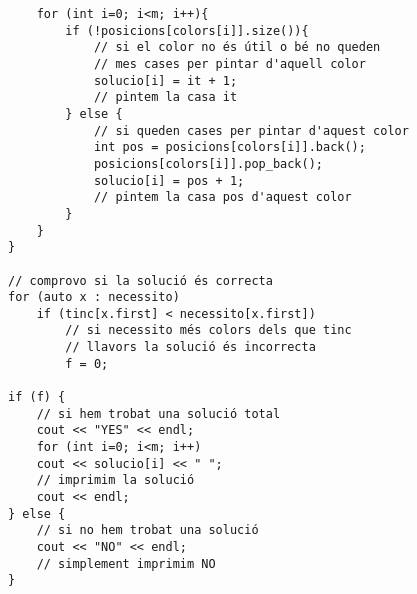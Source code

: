 \begin{lstlisting}
    for (int i=0; i<m; i++){
        if (!posicions[colors[i]].size()){
            // si el color no és útil o bé no queden
            // mes cases per pintar d'aquell color
            solucio[i] = it + 1;
            // pintem la casa it
        } else {
            // si queden cases per pintar d'aquest color
            int pos = posicions[colors[i]].back();
            posicions[colors[i]].pop_back();
            solucio[i] = pos + 1;
            // pintem la casa pos d'aquest color
        }
    }
}

// comprovo si la solució és correcta
for (auto x : necessito)
    if (tinc[x.first] < necessito[x.first])
        // si necessito més colors dels que tinc
        // llavors la solució és incorrecta
        f = 0;

if (f) {
    // si hem trobat una solució total
    cout << "YES" << endl;
    for (int i=0; i<m; i++)
    cout << solucio[i] << " ";
    // imprimim la solució
    cout << endl;
} else {
    // si no hem trobat una solució
    cout << "NO" << endl;
    // simplement imprimim NO
}

\end{lstlisting}

